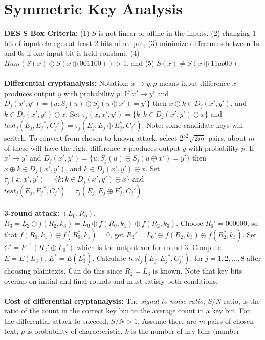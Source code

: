 \section{Symmetric Key Analysis}
{\bf DES S Box Criteria:} (1) $S$ is not linear or affine in the inputs,
(2) changing 1 bit of input changes at least 2 bits of output, (3)
minimize differences between 1s and 0s if one input bit is held constant,
(4)$Ham(S(x) \oplus S(x \oplus 001100))>1$, and
(5) $S(x) \ne S(x \oplus 11ab00)$.
\\
\\
{\bf Differential cryptanalysis: }  Notation: $ x \rightarrow y, p$ means
input difference $x$ produces output $y$ with probability $p$.
If $x' \rightarrow y'$ and $D_j(x',y')= \{u: S_j(u) \oplus S_j(u \oplus x')= y'\}$
then
$x \oplus k \in D_j(x', y')$, and $k \in D_j(x', y') \oplus x$.  Set
$\tau_j (x, x', y')= \{ k: k \in D_j(x',y') \oplus x \}$ and
$test_j (E_j , {E_j}^*, C_j ' ) = \tau_j(E_j, E_j \oplus E_j^{*}, C_j')$.
Note: some candidate keys will scritch.
To convert from chosen to known attack, select $2^{32} {\sqrt {2m}}$ pairs,
about $m$ of these will have the right difference 
$x$ produces output $y$ with probability $p$.
If $x' \rightarrow y'$ and $D_j(x',y')= \{u: S_j(u) \oplus S_j(u \oplus x')= y'\}$
then
$x \oplus k \in D_j(x', y')$, and $k \in D_j(x', y') \oplus x$.  Set
$\tau_j (x, x', y')= \{ k: k \in D_j(x',y') \oplus x \}$ and
$test_j (E_j , {E_j}^*, C_j ' ) = \tau_j(E_j, E_j \oplus E_j^{*}, C_j')$.
\\
\\
{\bf 3-round attack: } $(L_0 , R_0 )$, $R_3 = L_2 \oplus
f(R_2 , k_3 )= L_0 \oplus   f(R_0 , k_1 ) \oplus f(R_2 , k_3 )$.
Choose ${R_0}' = 000000$, so that
$f(R_0 , k_1 ) \oplus   f(R_0^* , k_1 ) = 0$, get
$R_3 '  = L_0 ' \oplus   f(R_2 , k_3 ) \oplus f(R_2^* , k_3 )$.
Set $C'= P^{-1} (R_3 ' \oplus L_0 ')$ which is the output xor for round 3.
Compute
$E=E(L_3 )$, $E^*=E(L_3^* )$.  Calculate
$test_j (E_j , {E_j}^*, C_j ' )$, for $j= 1,2,...,8$ after choosing
plaintexts.
Can do this since $R_2= L_3$ is known.
Note that key bits overlap on initial and final rounds and must satisfy both conditions.
\\
\\
{\bf Cost of differential cryptanalysis: }  The \emph{signal to noise ratio},
$S/N$ ratio,
is the ratio of the count in the correct key bin to the average count in a key bin.
For the differential attack to succeed, $S/N>1$.  Assume there are $m$ pairs of chosen text,
$p$ is probability of characteristic, $k$ is the number of key bins (number
